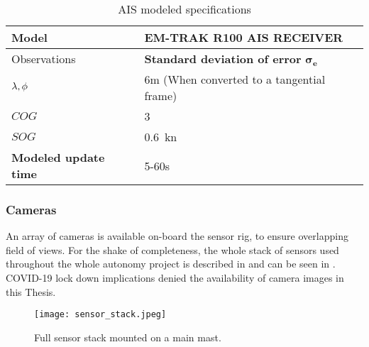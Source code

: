 \begin{table}[H]
	\centering
	\caption{AIS modeled specifications}
	\label{tab:AIS_specs}
	\begin{tabular}{ll}
		\hline
		\textbf{Model} &  EM-TRAK R100 AIS RECEIVER \T \\ \hline
		Observations&\textbf{Standard deviation of error} $\mathbf{\sigma_e}$   \T \\
		${{\lambda} ,{\phi}}$ & 6m (When converted to a tangential frame) \\
		${COG}$ & \SI{3}{\deg} \\
		${SOG}$ & \SI{0.6}{\knot} \T \\ \hline
		\textbf{Modeled update time} & 5-60s \T \\ \hline
	\end{tabular}
\end{table}

\subsubsection{Cameras}

An array of cameras is available on-board the sensor rig, to ensure overlapping field of views. For the shake of completeness, the whole stack of sensors used throughout the whole autonomy project is described in  and can be seen in . COVID-19 lock down implications denied the availability of camera images in this Thesis.


\begin{figure}[H]
	\centering
	\texttt{[image: sensor\_stack.jpeg]}
	\caption{Full sensor stack mounted on a main mast.}
	\label{fig:stack}
\end{figure}

\begin{table}[H]
	\centering
	\caption{Sensor stack on the mast illustrated in .}
	\label{tab:stack}
\end{table}

